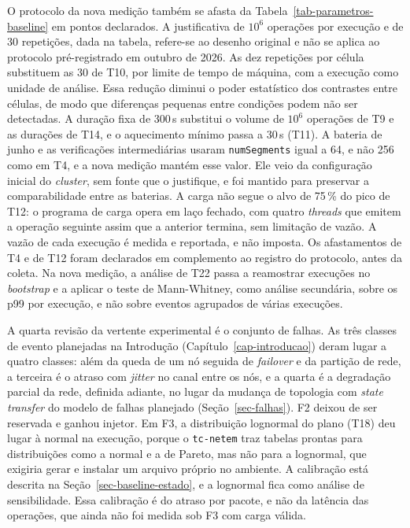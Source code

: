 O protocolo da nova medição também se afasta da Tabela~\ref{tab-parametros-baseline} em pontos declarados. A justificativa de $10^6$ operações por execução e de 30 repetições, dada na tabela, refere-se ao desenho original e não se aplica ao protocolo pré-registrado em outubro de 2026. As dez repetições por célula substituem as 30 de T10, por limite de tempo de máquina, com a execução como unidade de análise. Essa redução diminui o poder estatístico dos contrastes entre células, de modo que diferenças pequenas entre condições podem não ser detectadas. A duração fixa de 300\,s substitui o volume de $10^6$ operações de T9 e as durações de T14, e o aquecimento mínimo passa a 30\,s (T11). A bateria de junho e as verificações intermediárias usaram \texttt{numSegments} igual a 64, e não 256 como em T4, e a nova medição mantém esse valor. Ele veio da configuração inicial do \emph{cluster}, sem fonte que o justifique, e foi mantido para preservar a comparabilidade entre as baterias. A carga não segue o alvo de 75\,\% do pico de T12: o programa de carga opera em laço fechado, com quatro \emph{threads} que emitem a operação seguinte assim que a anterior termina, sem limitação de vazão. A vazão de cada execução é medida e reportada, e não imposta. Os afastamentos de T4 e de T12 foram declarados em complemento ao registro do protocolo, antes da coleta. Na nova medição, a análise de T22 passa a reamostrar execuções no \emph{bootstrap} e a aplicar o teste de Mann-Whitney, como análise secundária, sobre os p99 por execução, e não sobre eventos agrupados de várias execuções.

A quarta revisão da vertente experimental é o conjunto de falhas. As três classes de evento planejadas na Introdução (Capítulo~\ref{cap-introducao}) deram lugar a quatro classes: além da queda de um nó seguida de \emph{failover} e da partição de rede, a terceira é o atraso com \emph{jitter} no canal entre os nós, e a quarta é a degradação parcial da rede, definida adiante, no lugar da mudança de topologia com \emph{state transfer} do modelo de falhas planejado (Seção~\ref{sec-falhas}). F2 deixou de ser reservada e ganhou injetor. Em F3, a distribuição lognormal do plano (T18) deu lugar à normal na execução, porque o \texttt{tc-netem} traz tabelas prontas para distribuições como a normal e a de Pareto, mas não para a lognormal, que exigiria gerar e instalar um arquivo próprio no ambiente. A calibração está descrita na Seção~\ref{sec-baseline-estado}, e a lognormal fica como análise de sensibilidade. Essa calibração é do atraso por pacote, e não da latência das operações, que ainda não foi medida sob F3 com carga válida.

